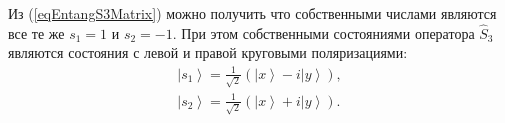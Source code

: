 
Из (\ref{eqEntangS3Matrix}) можно получить что собственными числами
являются все те же $s_1 = 1$ и $s_2 = -1$. При этом собственными
состояниями оператора $\hat{S}_3$ являются состояния с левой и правой
круговыми поляризациями:
\begin{eqnarray}
  \left| s_1 \right> = \frac{1}{\sqrt{2}}
  \left(
  \left|x\right> - i \left|y\right>
  \right),
  \nonumber \\
  \left| s_2 \right> = \frac{1}{\sqrt{2}}
  \left(
  \left|x\right> + i \left|y\right>
  \right).
  \label{eqEntangS3Eigenvec}
\end{eqnarray}






